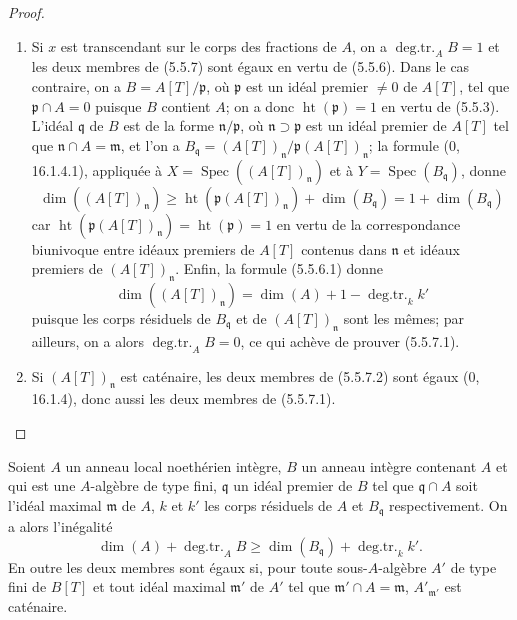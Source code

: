 \begin{proof}
\begin{enumerate}
\item[(i)] Si $x$ est transcendant sur le corps des fractions de $A$, on a
$\operatorname{deg.tr.}_A B=1$ et les deux membres de (5.5.7) sont égaux en
vertu de (5.5.6). Dans le cas contraire, on a $B=A[T]/\mathfrak p$, où
$\mathfrak p$ est un idéal premier $\ne0$ de $A[T]$, tel que
$\mathfrak p\cap A=0$ puisque $B$ contient $A$; on a donc
$\operatorname{ht}(\mathfrak p)=1$ en vertu de (5.5.3). L'idéal
$\mathfrak q$ de $B$ est de la forme $\mathfrak n/\mathfrak p$, où
$\mathfrak n\supset\mathfrak p$ est un idéal premier de $A[T]$ tel que
$\mathfrak n\cap A=\mathfrak m$, et l'on a
$B_{\mathfrak q}=(A[T])_{\mathfrak n}/\mathfrak p(A[T])_{\mathfrak n}$;
la formule (0, 16.1.4.1), appliquée à
$X=\operatorname{Spec}((A[T])_{\mathfrak n})$ et à
$Y=\operatorname{Spec}(B_{\mathfrak q})$, donne
\begin{equation}
\dim((A[T])_{\mathfrak n})
\geq\operatorname{ht}(\mathfrak p(A[T])_{\mathfrak n})
+\dim(B_{\mathfrak q})=1+\dim(B_{\mathfrak q})
\tag{5.5.7.2}\label{IV.2.s5.5.7.2-fr}
\end{equation}
car $\operatorname{ht}(\mathfrak p(A[T])_{\mathfrak n})
=\operatorname{ht}(\mathfrak p)=1$ en vertu de la correspondance biunivoque
entre idéaux premiers de $A[T]$ contenus dans $\mathfrak n$ et idéaux
premiers de $(A[T])_{\mathfrak n}$. Enfin, la formule (5.5.6.1) donne
\begin{equation}
\dim((A[T])_{\mathfrak n})
=\dim(A)+1-\operatorname{deg.tr.}_k k'
\tag{5.5.7.3}\label{IV.2.s5.5.7.3-fr}
\end{equation}
puisque les corps résiduels de $B_{\mathfrak q}$ et de
$(A[T])_{\mathfrak n}$ sont les mêmes; par ailleurs, on a alors
$\operatorname{deg.tr.}_A B=0$, ce qui achève de prouver (5.5.7.1).
\item[(ii)] Si $(A[T])_{\mathfrak n}$ est caténaire, les deux membres de
(5.5.7.2) sont égaux (0, 16.1.4), donc aussi les deux membres de (5.5.7.1).
\end{enumerate}
\end{proof}

\begin{theorem}
\label{IV.2.s5.5.8-fr}
Soient $A$ un anneau local noethérien intègre, $B$ un anneau intègre contenant
$A$ et qui est une $A$-algèbre de type fini, $\mathfrak q$ un idéal premier
de $B$ tel que $\mathfrak q\cap A$ soit l'idéal maximal $\mathfrak m$ de
$A$, $k$ et $k'$ les corps résiduels de $A$ et $B_{\mathfrak q}$
respectivement. On a alors l'inégalité
\begin{equation}
\dim(A)+\operatorname{deg.tr.}_A B
\geq\dim(B_{\mathfrak q})+\operatorname{deg.tr.}_k k'.
\tag{5.5.8.1}\label{IV.2.s5.5.8.1-fr}
\end{equation}
En outre les deux membres sont égaux si, pour toute sous-$A$-algèbre $A'$ de
type fini de $B[T]$ et tout idéal maximal $\mathfrak m'$ de $A'$ tel que
$\mathfrak m'\cap A=\mathfrak m$, $A'_{\mathfrak m'}$ est caténaire.
\end{theorem}

